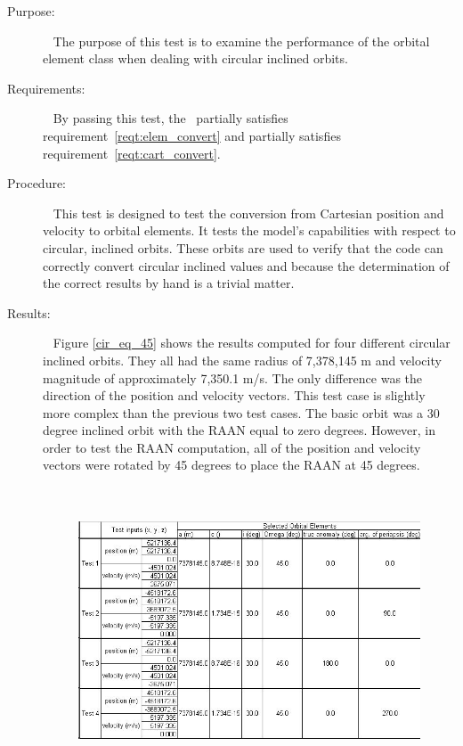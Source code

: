 \label{test:circ_inc_per}
\begin{description}
\item[Purpose:] \ \newline
The purpose of this test is to examine the performance of the orbital element
class when dealing with circular inclined orbits.
\item[Requirements:] \ \newline
By passing this test, the \OrbitalElement\ partially satisfies
requirement~\ref{reqt:elem_convert} and partially satisfies
requirement~\ref{reqt:cart_convert}.
\item[Procedure:]\ \newline
This test is designed to test the conversion from Cartesian position and
velocity to orbital elements.  It tests the model's capabilities with respect
to circular, inclined orbits.  These orbits are used to verify that the
code can correctly convert circular inclined values and because the
determination of the correct results by hand is a trivial matter.
\item[Results:]\ \newline
Figure \ref{cir_eq_45} shows the results computed for four different circular
inclined orbits.  They all had the same radius of 7,378,145 m and velocity
magnitude of approximately 7,350.1 m/s.  The only difference was the direction
of the position and velocity vectors.  This test case is slightly more complex
than the previous two test cases.  The basic orbit was a 30 degree inclined
orbit with the RAAN equal to zero degrees.  However, in order to test the
RAAN computation, all of the position and velocity vectors were rotated by
45 degrees to place the RAAN at 45 degrees.
\begin{figure}[h]
\begin{center}
\includegraphics[height=85mm]{JPGfiles/cir_in_45.jpg}

\end{center}
\end{figure}
\end{description}
